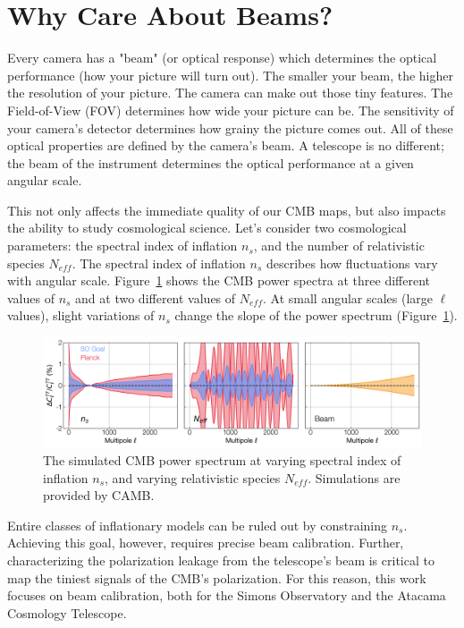 \section{Why Care About Beams?}
Every camera has a "beam" (or optical response) which determines the optical performance (how your picture will turn out).  The smaller your beam, the higher the resolution of your picture.  The camera can make out those tiny features.  The Field-of-View (FOV) determines how wide your picture can be.  The sensitivity of your camera's detector determines how grainy the picture comes out.  All of these optical properties are defined by the camera's beam.  A telescope is no different; the beam of the instrument determines the optical performance at a given angular scale.  

This not only affects the immediate quality of our CMB maps, but also impacts the ability to study cosmological science.  Let's consider two cosmological parameters: the spectral index of inflation $n_s$, and the number of relativistic species $N_{eff}$.  The spectral index of inflation $n_s$ describes how fluctuations vary with angular scale.  Figure~\ref{fig:cmb_ns} shows the CMB power spectra at three different values of $n_s$ and at two different values of $N_{eff}$.  At small angular scales (large $\ell$ values), slight variations of $n_s$ change the slope of the power spectrum (Figure~\ref{fig:cmb_ns}).

\begin{figure}[t!]
    \centering
    \includegraphics[width = .99\textwidth]{Figures/spectrabeams.png}
    \caption{The simulated CMB power spectrum at varying spectral index of inflation $n_s$, and varying relativistic species $N_{eff}$.  Simulations are provided by CAMB.}
    \label{fig:cmb_ns}
\end{figure}


Entire classes of inflationary models can be ruled out by constraining $n_s$.  Achieving this goal, however, requires precise beam calibration.  Further, characterizing the polarization leakage from the telescope's beam is critical to map the tiniest signals of the CMB's polarization.  For this reason, this work focuses on beam calibration, both for the Simons Observatory and the Atacama Cosmology Telescope.

